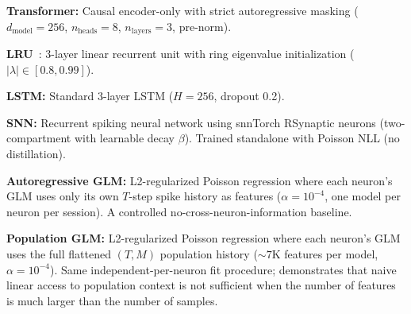 \documentclass{article}
\begin{document}
\textbf{Transformer:} Causal encoder-only with strict autoregressive masking
($d_\mathrm{model}{=}256$, $n_\mathrm{heads}{=}8$, $n_\mathrm{layers}{=}3$,
pre-norm).

\textbf{LRU}~\citep{orvieto2023resurrecting}: 3-layer linear recurrent
unit with ring eigenvalue initialization
($|\lambda| \in [0.8, 0.99]$).

\textbf{LSTM:} Standard 3-layer LSTM ($H{=}256$, dropout 0.2).

\textbf{SNN:} Recurrent spiking neural network using snnTorch RSynaptic
neurons (two-compartment with learnable decay $\beta$).
Trained standalone with Poisson NLL (no distillation).

\textbf{Autoregressive GLM:} L2-regularized Poisson regression where
each neuron's GLM uses only its own $T$-step spike history as features
($\alpha{=}10^{-4}$, one model per neuron per session).  A controlled
no-cross-neuron-information baseline.

\textbf{Population GLM:} L2-regularized Poisson regression where each
neuron's GLM uses the full flattened $(T, M)$ population history
(${\sim}7\text{K}$ features per model, $\alpha{=}10^{-4}$).  Same
independent-per-neuron fit procedure; demonstrates that naive linear
access to population context is not sufficient when the number of
features is much larger than the number of samples.
\end{document}
